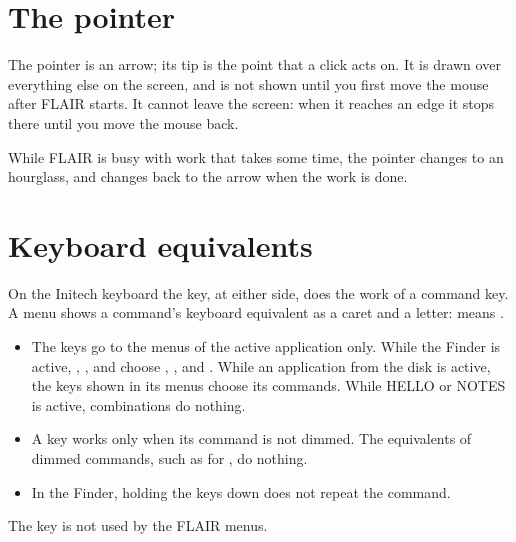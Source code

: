 \section{The pointer}
The pointer is an arrow; its tip is the point that a click acts on.  It is
drawn over everything else on the screen, and is not shown until you first
move the mouse after FLAIR starts.  It cannot leave the screen: when it
reaches an edge it stops there until you move the mouse back.

While FLAIR is busy with work that takes some time, the pointer changes to
an hourglass, and changes back to the arrow when the work is done.

\section{Keyboard equivalents}
On the Initech keyboard the  key, at either side, does the work
of a command key.  A menu shows a command's keyboard equivalent as a caret
and a letter:  means .
\begin{itemize}
\item The keys go to the menus of the active application only.  While the
  Finder is active, , ,  and
   choose , ,
   and .  While an application
  from the disk is active, the keys shown in its menus choose its commands.
  While HELLO or NOTES is active,  combinations do nothing.
\item A key works only when its command is not dimmed.  The equivalents of
  dimmed commands, such as  for , do nothing.
\item In the Finder, holding the keys down does not repeat the command.
\end{itemize}
The  key is not used by the FLAIR menus.


